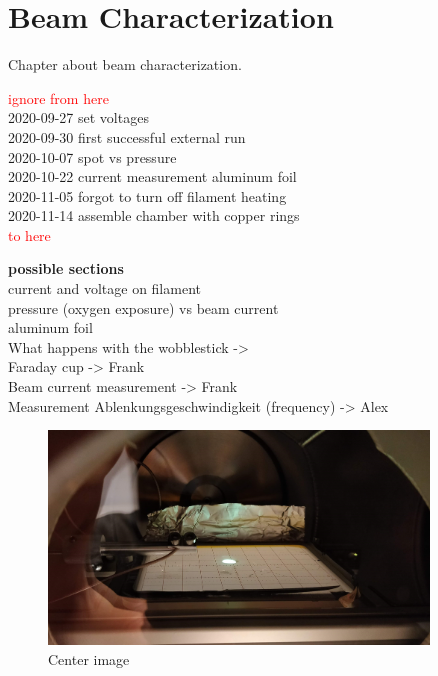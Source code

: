 
\chapter{Beam Characterization}
\label{ch:Beam Characterization}

Chapter about beam characterization.

\noindent \textcolor{red}{ignore from here} \\
2020-09-27 set voltages \\
2020-09-30 first successful external run \\
2020-10-07 spot vs pressure \\
2020-10-22 current measurement aluminum foil \\
2020-11-05 forgot to turn off filament heating \\
2020-11-14 assemble chamber with copper rings \\
\textcolor{red}{to here}

\noindent \textbf{possible sections} \\
current and voltage on filament \\
pressure (oxygen exposure) vs beam current \\
aluminum foil \\
What happens with the wobblestick ->  \\
Faraday cup -> Frank \\
Beam current measurement -> Frank \\
Measurement Ablenkungsgeschwindigkeit (frequency) -> Alex \\

\begin{figure}[h]
	\centering
	\includegraphics[width=0.9\textwidth]{./Chapters/beam-characterization/center_image}
	\caption{Center image}
	\label{fig:Center image.}
\end{figure}